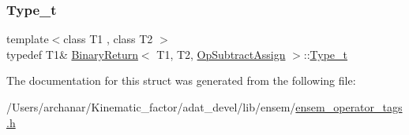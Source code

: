 \mbox{\label{structBinaryReturn_3_01T1_00_01T2_00_01OpSubtractAssign_01_4_a93357e4d56f953a4f58fec3320ba9db3}} 
\subsubsection{\texorpdfstring{Type\_t}{Type\_t}\hspace{0.1cm}{\footnotesize\ttfamily [2/2]}}
{\footnotesize\ttfamily template$<$class T1 , class T2 $>$ \\
typedef T1\& \mbox{\hyperlink{structBinaryReturn}{Binary\+Return}}$<$ T1, T2, \mbox{\hyperlink{structOpSubtractAssign}{Op\+Subtract\+Assign}} $>$\+::\mbox{\hyperlink{structBinaryReturn_3_01T1_00_01T2_00_01OpSubtractAssign_01_4_a93357e4d56f953a4f58fec3320ba9db3}{Type\+\_\+t}}}



The documentation for this struct was generated from the following file\+:\begin{DoxyCompactItemize}
\item 
/\+Users/archanar/\+Kinematic\+\_\+factor/adat\+\_\+devel/lib/ensem/\mbox{\hyperlink{lib_2ensem_2ensem__operator__tags_8h}{ensem\+\_\+operator\+\_\+tags.\+h}}\end{DoxyCompactItemize}
